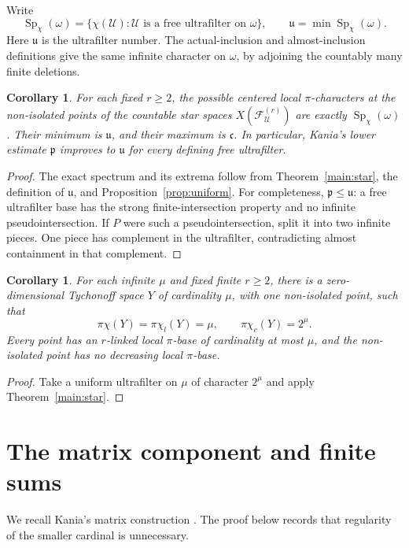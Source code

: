 \documentclass[10pt,a4paper]{amsart}
\newtheorem{corollary}[theorem]{Corollary}
\theoremstyle{definition}
\theoremstyle{remark}
\newcommand{\cont}{\mathfrak c}
\newcommand{\U}{\mathcal U}
\newcommand{\F}{\mathcal F}
\newcommand{\pc}{\pi\chi}
\newcommand{\pcl}{\pi\chi_l}
\newcommand{\pcc}{\pi\chi_c}
\begin{document}
Write
\[
\operatorname{Sp}_\chi(\omega)=
\{\chi(\U):\U\text{ is a free ultrafilter on }\omega\},
\qquad \mathfrak u=\min\operatorname{Sp}_\chi(\omega).
\]
Here $\mathfrak u$ is the ultrafilter number. The actual-inclusion and almost-inclusion definitions give the same infinite character on $\omega$, by adjoining the countably many finite deletions.

\begin{corollary}\label{cor:spectrum}
For each fixed $r\geqslant2$, the possible centered local $\pi$-characters at the non-isolated points of the countable star spaces $X(\F_\U^{(r)})$ are exactly $\operatorname{Sp}_\chi(\omega)$. Their minimum is $\mathfrak u$, and their maximum is $\cont$. In particular, Kania's lower estimate $\mathfrak p$ improves to $\mathfrak u$ for every defining free ultrafilter.
\end{corollary}
\begin{proof}
The exact spectrum and its extrema follow from Theorem~\ref{main:star}, the definition of $\mathfrak u$, and Proposition~\ref{prop:uniform}. For completeness, $\mathfrak p\leqslant\mathfrak u$: a free ultrafilter base has the strong finite-intersection property and no infinite pseudointersection. If $P$ were such a pseudointersection, split it into two infinite pieces. One piece has complement in the ultrafilter, contradicting almost containment in that complement.
\end{proof}

\begin{corollary}\label{cor:countable}
For each infinite $\mu$ and fixed finite $r\geqslant2$, there is a zero-dimensional Tychonoff space $Y$ of cardinality $\mu$, with one non-isolated point, such that
\[
\pc(Y)=\pcl(Y)=\mu,\qquad\pcc(Y)=2^\mu.
\]
Every point has an $r$-linked local $\pi$-base of cardinality at most $\mu$, and the non-isolated point has no decreasing local $\pi$-base.
\end{corollary}
\begin{proof}
Take a uniform ultrafilter on $\mu$ of character $2^\mu$ and apply Theorem~\ref{main:star}.
\end{proof}
\section{The matrix component and finite sums}

We recall Kania's matrix construction \cite[Section 4 and Remark 5.2]{Kania}. The proof below records that regularity of the smaller cardinal is unnecessary.
\end{document}
